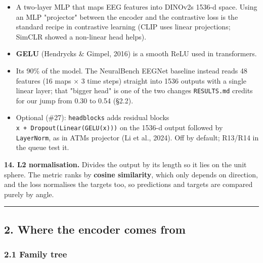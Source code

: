 \documentclass[
  11pt,
]{article}
\providecommand{\tightlist}{%
  \setlength{\itemsep}{0pt}\setlength{\parskip}{0pt}}
\renewcommand{\_}{\oldunderscore\allowbreak}
\begin{document}
\begin{itemize}
\tightlist
\item
  A two-layer MLP that maps EEG features
  into DINOv2\textquotesingle s 1536-d
  space. Using an MLP "projector"
  between the encoder and the
  contrastive loss is the standard
  recipe in contrastive learning (CLIP
  uses linear projections; SimCLR showed
  a non-linear head helps).
\item
  \textbf{GELU} (Hendrycks \& Gimpel,
  2016) is a smooth ReLU used in
  transformers.
\item
  It\textquotesingle s 90\% of the
  model. The NeuralBench EEGNet baseline
  instead reads 48 features (16 maps × 3
  time steps) straight into 1536 outputs
  with a single linear layer; that
  "bigger head" is one of the two
  changes \texttt{RESULTS.md} credits
  for our jump from 0.30 to 0.54 (§2.2).
\item
  Optional (\#27): \texttt{head\_blocks}
  adds residual blocks
  \texttt{x\ +\ Dropout(Linear(GELU(x)))}
  on the 1536-d output followed by
  \texttt{LayerNorm}, as in
  ATM\textquotesingle s projector (Li et
  al., 2024). Off by default; R13/R14 in
  the queue test it.
\end{itemize}

\textbf{14. L2 normalisation.} Divides
the output by its length so it lies on
the unit sphere. The metric ranks by
\textbf{cosine similarity}, which only
depends on direction, and the loss
normalises the targets too, so
predictions and targets are compared
purely by angle.

\begin{center}\rule{0.5\linewidth}{0.5pt}\end{center}

\subsection{2. Where the encoder comes
from}\label{where-the-encoder-comes-from}

\subsubsection{2.1 Family
tree}\label{family-tree}
\end{document}
